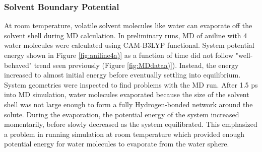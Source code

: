 \documentclass[
journal=jpcbfk, %
manuscript=article]{achemso}
\begin{document}
	\subsubsection{Solvent Boundary Potential}
	At room temperature, volatile solvent molecules like water can evaporate off the solvent shell during MD calculation. In preliminary runs, MD of aniline with 4 water molecules were calculated using CAM-B3LYP functional. System potential energy shown in Figure \ref{fig:aniline4a)} as a function of time did not follow "well-behaved" trend seen previously (Figure \ref{fig:MDdataa)}). Instead, the energy increased to almost initial energy before eventually settling into equilibrium. System geometries were inspected to find problems with the MD run. After 1.5 ps into MD simulation, water molecules evaporated because the size of the solvent shell was not large enough to form a fully Hydrogen-bonded network around the solute. During the evaporation, the potential energy of the system increased momentarily, before slowly decreased as the system equilibrated. This emphasized a problem in running simulation at room temperature which provided enough potential energy for water molecules to evaporate from the water sphere. 
\end{document}
